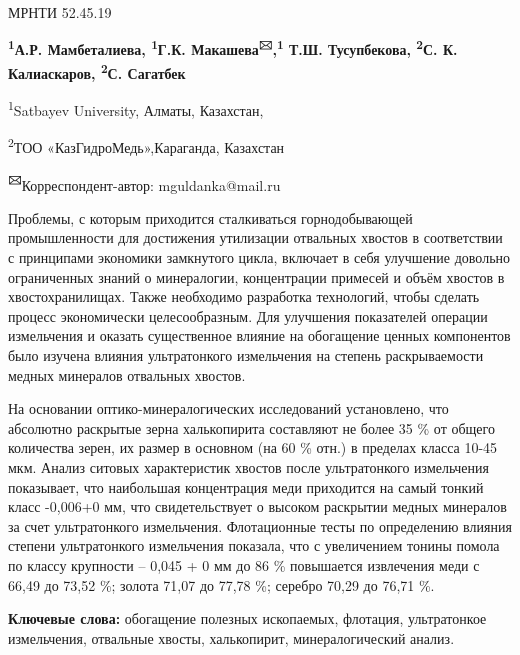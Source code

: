 
\newpage
МРНТИ 52.45.19


\begin{center}
{\bfseries \textsuperscript{1}А.Р. Мамбеталиева, \textsuperscript{1}Г.К. Макашева\textsuperscript{🖂},\textsuperscript{1} Т.Ш. Тусупбекова, \textsuperscript{2}С. К. Калиаскаров, \textsuperscript{2}С. Сагатбек}

\textsuperscript{1}Satbayev University, Алматы, Казахстан,

\textsuperscript{2}ТОО «КазГидроМедь»,Караганда, Казахстан

{\bfseries \textsuperscript{🖂}}Корреспондент-автор: mguldanka@mail.ru
\end{center}

Проблемы, с которым приходится сталкиваться горнодобывающей
промышленности для достижения утилизации отвальных хвостов в
соответствии с принципами экономики замкнутого цикла, включает в себя
улучшение довольно ограниченных знаний о минералогии, концентрации
примесей и объём хвостов в хвостохранилищах. Также необходимо разработка
технологий, чтобы сделать процесс экономически целесообразным. Для
улучшения показателей операции измельчения и оказать существенное
влияние на обогащение ценных компонентов было изучена влияния
ультратонкого измельчения на степень раскрываемости медных минералов
отвальных хвостов.

На основании оптико-минералогических исследований установлено, что
абсолютно раскрытые зерна халькопирита составляют не более 35 \% от
общего количества зерен, их размер в основном (на 60 \% отн.) в пределах
класса 10-45 мкм. Анализ ситовых характеристик хвостов после
ультратонкого измельчения показывает, что наибольшая концентрация меди
приходится на самый тонкий класс -0,006+0 мм, что свидетельствует о
высоком раскрытии медных минералов за счет ультратонкого измельчения.
Флотационные тесты по определению влияния степени ультратонкого
измельчения показала, что с увеличением тонины помола по классу
крупности -- 0,045 + 0 мм до 86 \% повышается извлечения меди с 66,49 до
73,52 \%; золота 71,07 до 77,78 \%; серебро 70,29 до 76,71 \%.

{\bfseries Ключевые слова:} обогащение полезных ископаемых, флотация,
ультратонкое измельчения, отвальные хвосты, халькопирит,
минералогический анализ.

